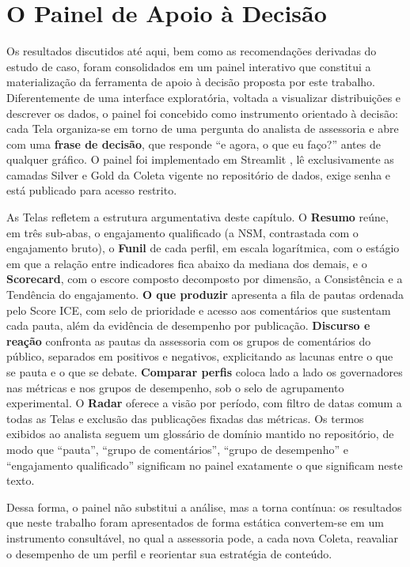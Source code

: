 \section{O Painel de Apoio à Decisão}\label{sec:painel}

Os resultados discutidos até aqui, bem como as recomendações derivadas do estudo de caso, foram consolidados em um painel interativo que constitui a materialização da ferramenta de apoio à decisão proposta por este trabalho. Diferentemente de uma interface exploratória, voltada a visualizar distribuições e descrever os dados, o painel foi concebido como instrumento orientado à decisão: cada Tela organiza-se em torno de uma pergunta do analista de assessoria e abre com uma \textbf{frase de decisão}, que responde ``e agora, o que eu faço?'' antes de qualquer gráfico. O painel foi implementado em Streamlit \cite{streamlit2026}, lê exclusivamente as camadas Silver e Gold da Coleta vigente no repositório de dados, exige senha e está publicado para acesso restrito.

As Telas refletem a estrutura argumentativa deste capítulo. O \textbf{Resumo} reúne, em três sub-abas, o engajamento qualificado (a NSM, contrastada com o engajamento bruto), o \textbf{Funil} de cada perfil, em escala logarítmica, com o estágio em que a relação entre indicadores fica abaixo da mediana dos demais, e o \textbf{Scorecard}, com o escore composto decomposto por dimensão, a Consistência e a Tendência do engajamento. \textbf{O que produzir} apresenta a fila de pautas ordenada pelo Score ICE, com selo de prioridade e acesso aos comentários que sustentam cada pauta, além da evidência de desempenho por publicação. \textbf{Discurso e reação} confronta as pautas da assessoria com os grupos de comentários do público, separados em positivos e negativos, explicitando as lacunas entre o que se pauta e o que se debate. \textbf{Comparar perfis} coloca lado a lado os governadores nas métricas e nos grupos de desempenho, sob o selo de agrupamento experimental. O \textbf{Radar} oferece a visão por período, com filtro de datas comum a todas as Telas e exclusão das publicações fixadas das métricas. Os termos exibidos ao analista seguem um glossário de domínio mantido no repositório, de modo que ``pauta'', ``grupo de comentários'', ``grupo de desempenho'' e ``engajamento qualificado'' significam no painel exatamente o que significam neste texto.

Dessa forma, o painel não substitui a análise, mas a torna contínua: os resultados que neste trabalho foram apresentados de forma estática convertem-se em um instrumento consultável, no qual a assessoria pode, a cada nova Coleta, reavaliar o desempenho de um perfil e reorientar sua estratégia de conteúdo.

